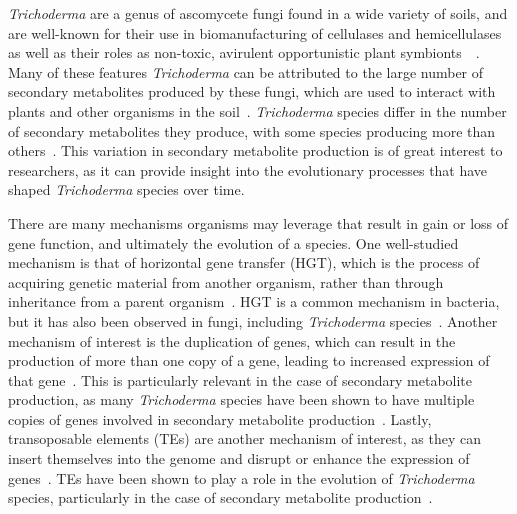 \textit{Trichoderma} are a genus of ascomycete fungi found in a wide
variety of soils, and are well-known for their use in biomanufacturing
of cellulases and hemicellulases as well as their roles as non-toxic,
avirulent opportunistic plant symbionts~\cite{woo2023a}~\cite{kubicek2019a}. 
Many of these features \textit{Trichoderma}
can be attributed to the large number of secondary metabolites
produced by these fungi, which are used to interact with plants and other organisms in the soil~\cite{Mukherjee2012}. \textit{Trichoderma} species differ in the number of secondary metabolites they produce, with some species producing more than others~\cite{Mukherjee2012}. This variation in secondary metabolite production is of great interest to researchers, as it can provide insight into the evolutionary processes that have shaped \textit{Trichoderma} species over time.

There are many mechanisms organisms may leverage that result in gain or loss of gene function, and ultimately the evolution of a species. One well-studied mechanism is that of horizontal gene transfer (HGT), which is the process of acquiring genetic material from another organism, rather than through inheritance from a parent organism~\cite{goncalves2024}. HGT is a common mechanism in bacteria, but it has also been observed in fungi, including \textit{Trichoderma} species~\cite{goncalves2024}. Another mechanism of interest is the duplication of genes, which can result in the production of more than one copy of a gene, leading to increased expression of that gene~\cite{goncalves2024}. This is particularly relevant in the case of secondary metabolite production, as many \textit{Trichoderma} species have been shown to have multiple copies of genes involved in secondary metabolite production~\cite{Mukherjee2012}. Lastly, transoposable elements (TEs) are another mechanism of interest, as they can insert themselves into the genome and disrupt or enhance the expression of genes~\cite{goncalves2024}. TEs have been shown to play a role in the evolution of \textit{Trichoderma} species, particularly in the case of secondary metabolite production~\cite{goncalves2024}. 

